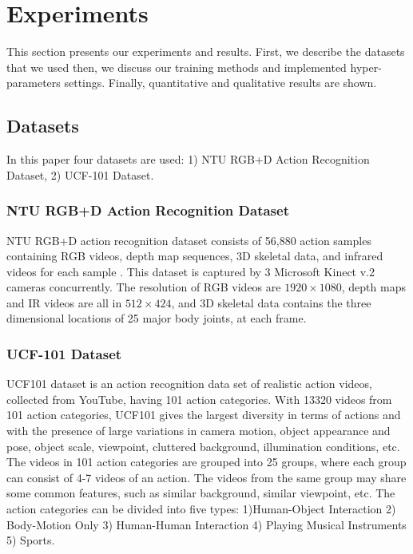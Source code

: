 \documentclass{article}
\begin{document}
%
%
\section{Experiments}
\label{experiments}
This section presents our experiments and results. First, we describe the datasets that we used then, we discuss our training methods and implemented hyper-parameters settings. Finally, quantitative and qualitative results are shown.

\subsection{Datasets}
In this paper four datasets are used: 1) NTU RGB+D Action Recognition Dataset, 2) UCF-101 Dataset.

\subsubsection{NTU RGB+D Action Recognition Dataset}
NTU RGB+D action recognition dataset consists of 56,880 action samples containing RGB videos, depth map sequences, 3D skeletal data, and infrared videos for each sample \cite{NTU}. This dataset is captured by 3 Microsoft Kinect v.2 cameras concurrently. The resolution of RGB videos are $1920 \times 1080$, depth maps and IR videos are all in $512 \times 424$, and 3D skeletal data contains the three dimensional locations of 25 major body joints, at each frame.

\subsubsection{UCF-101 Dataset}
UCF101 \cite{uCF101} dataset is an action recognition data set of realistic action videos, collected from YouTube, having 101 action categories. With 13320 videos from 101 action categories, UCF101 gives the largest diversity in terms of actions and with the presence of large variations in camera motion, object appearance and pose, object scale, viewpoint, cluttered background, illumination conditions, etc. The videos in 101 action categories are grouped into 25 groups, where each group can consist of 4-7 videos of an action. The videos from the same group may share some common features, such as similar background, similar viewpoint, etc. The action categories can be divided into five types: 1)Human-Object Interaction 2) Body-Motion Only 3) Human-Human Interaction 4) Playing Musical Instruments 5) Sports. 
\end{document}
